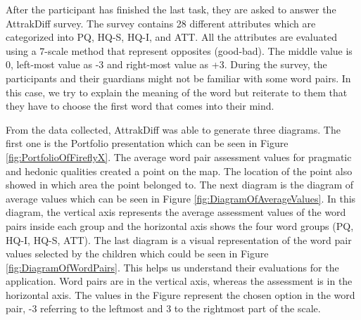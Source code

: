 After the participant has finished the last task, they are asked to answer the AttrakDiff survey. The survey contains 28 different attributes which are categorized into PQ, HQ-S, HQ-I, and ATT. All the attributes are evaluated using a 7-scale method that represent opposites (good-bad). The middle value is 0, left-most value as -3 and right-most value as +3.  During the survey, the participants and their guardians might not be familiar with some word pairs. In this case, we try to explain the meaning of the word but reiterate to them that they have to choose the first word that comes into their mind.

From the data collected, AttrakDiff was able to generate three diagrams. The first one is the Portfolio presentation which can be seen in Figure \ref{fig:PortfolioOfFireflyX}. The average word pair assessment values for pragmatic and hedonic qualities created a point on the map. The location of the point also showed in which area the point belonged to. The next diagram is the diagram of average values which can be seen in Figure \ref{fig:DiagramOfAverageValues}. In this diagram, the vertical axis represents  the  average  assessment  values  of  the  word  pairs inside each group and the horizontal axis shows the four word groups (PQ, HQ-I, HQ-S, ATT). The last diagram is a visual representation of the word pair values selected by the children which could be seen in Figure \ref{fig:DiagramOfWordPairs}. This helps us understand their evaluations for the application. Word pairs are in the vertical axis, whereas the assessment is in the horizontal axis. The values in the Figure represent the chosen option in the word pair, -3 referring to the leftmost and 3 to the rightmost part of the scale. 
